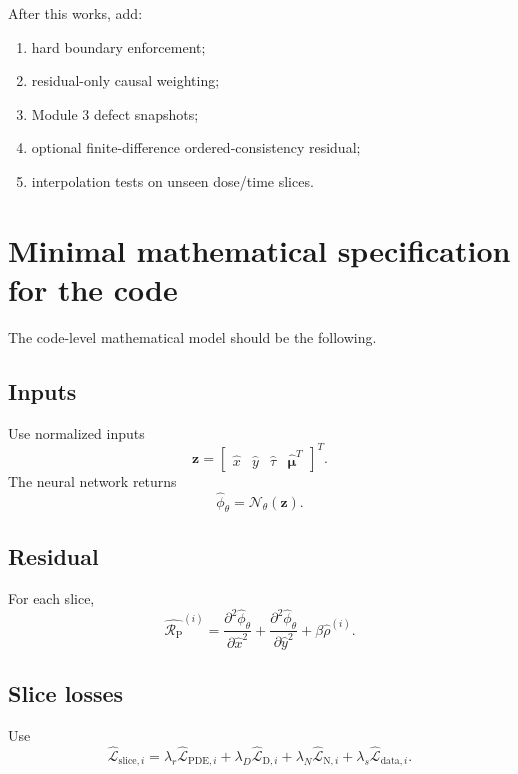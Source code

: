 \documentclass[11pt]{article}
\newcommand{\muv}{\bm{\mu}}
\newcommand{\Rpoisson}{\mathcal{R}_{\mathrm{P}}}
\newcommand{\taud}{\tau}
\begin{document}
After this works, add:
\begin{enumerate}[leftmargin=2em]
\item hard boundary enforcement;
\item residual-only causal weighting;
\item Module 3 defect snapshots;
\item optional finite-difference ordered-consistency residual;
\item interpolation tests on unseen dose/time slices.
\end{enumerate}

\section{Minimal mathematical specification for the code}

The code-level mathematical model should be the following.

\subsection{Inputs}

Use normalized inputs
\begin{equation}
\bm{z}=\begin{bmatrix}
\hat{x} & \hat{y} & \hat{\taud} & \hat{\muv}^T
\end{bmatrix}^T.
\end{equation}
The neural network returns
\begin{equation}
\hat{\phi}_{\theta}=\mathcal{N}_{\theta}(\bm{z}).
\end{equation}

\subsection{Residual}

For each slice,
\begin{equation}
\hat{\Rpoisson}^{(i)}=
\frac{\partial^2\hat{\phi}_{\theta}}{\partial\hat{x}^2}
+
\frac{\partial^2\hat{\phi}_{\theta}}{\partial\hat{y}^2}
+\beta\hat{\rho}^{(i)}.
\end{equation}

\subsection{Slice losses}

Use
\begin{equation}
\widehat{\mathcal{L}}_{\mathrm{slice},i}=
\lambda_r\widehat{\mathcal{L}}_{\mathrm{PDE},i}+
\lambda_D\widehat{\mathcal{L}}_{\mathrm{D},i}+
\lambda_N\widehat{\mathcal{L}}_{\mathrm{N},i}+
\lambda_s\widehat{\mathcal{L}}_{\mathrm{data},i}.
\end{equation}
\end{document}
